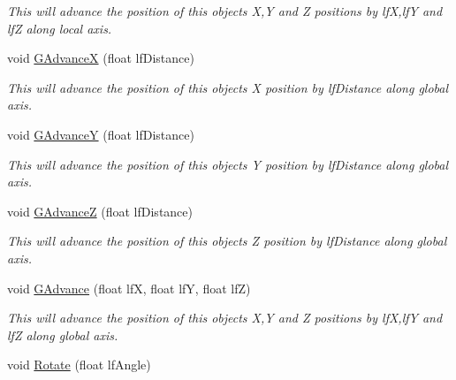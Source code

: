 \begin{DoxyCompactItemize}
\begin{DoxyCompactList}\small\item\em This will advance the position of this objects X,Y and Z positions by lfX,lfY and lfZ along local axis. \end{DoxyCompactList}\item 
\hypertarget{classc_camera_matrix4_a69ef5c53bd239d2f1041ac9330c2cc08}{
void \hyperlink{classc_camera_matrix4_a69ef5c53bd239d2f1041ac9330c2cc08}{GAdvanceX} (float lfDistance)}
\label{classc_camera_matrix4_a69ef5c53bd239d2f1041ac9330c2cc08}

\begin{DoxyCompactList}\small\item\em This will advance the position of this objects X position by lfDistance along global axis. \end{DoxyCompactList}\item 
\hypertarget{classc_camera_matrix4_a7cb5d64085acdcc74dcad1e965a52b3b}{
void \hyperlink{classc_camera_matrix4_a7cb5d64085acdcc74dcad1e965a52b3b}{GAdvanceY} (float lfDistance)}
\label{classc_camera_matrix4_a7cb5d64085acdcc74dcad1e965a52b3b}

\begin{DoxyCompactList}\small\item\em This will advance the position of this objects Y position by lfDistance along global axis. \end{DoxyCompactList}\item 
\hypertarget{classc_camera_matrix4_afd68814e78dd2ffaec2f9bc4289aca36}{
void \hyperlink{classc_camera_matrix4_afd68814e78dd2ffaec2f9bc4289aca36}{GAdvanceZ} (float lfDistance)}
\label{classc_camera_matrix4_afd68814e78dd2ffaec2f9bc4289aca36}

\begin{DoxyCompactList}\small\item\em This will advance the position of this objects Z position by lfDistance along global axis. \end{DoxyCompactList}\item 
\hypertarget{classc_camera_matrix4_a342b888f43a65b6c4a14b818c2519157}{
void \hyperlink{classc_camera_matrix4_a342b888f43a65b6c4a14b818c2519157}{GAdvance} (float lfX, float lfY, float lfZ)}
\label{classc_camera_matrix4_a342b888f43a65b6c4a14b818c2519157}

\begin{DoxyCompactList}\small\item\em This will advance the position of this objects X,Y and Z positions by lfX,lfY and lfZ along global axis. \end{DoxyCompactList}\item 
\hypertarget{classc_camera_matrix4_a1de293dc89d68f1688098dc82a1c2655}{
void \hyperlink{classc_camera_matrix4_a1de293dc89d68f1688098dc82a1c2655}{Rotate} (float lfAngle)}
\label{classc_camera_matrix4_a1de293dc89d68f1688098dc82a1c2655}


\end{DoxyCompactItemize}
